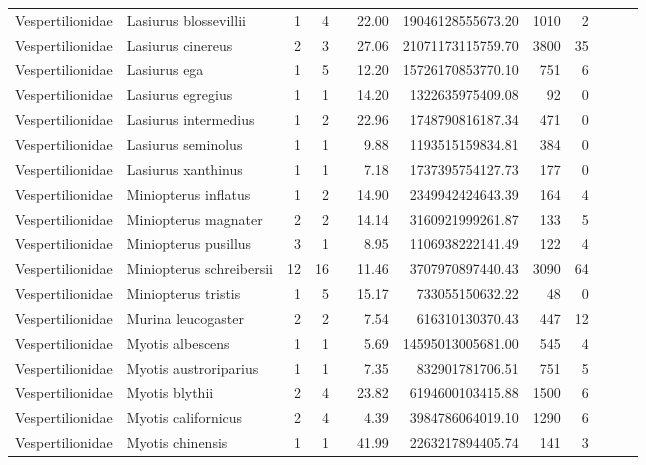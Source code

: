 \begin{landscape}
\begin{longtable}{@{}llrrrrrrrrrr@{}}
  Vespertilionidae & Lasiurus blossevillii &   1 &   4 &  & 22.00 & 19046128555673.20 & 1010 &   2 &  &  &  \\ 
  Vespertilionidae & Lasiurus cinereus &   2 &   3 &  & 27.06 & 21071173115759.70 & 3800 &  35 &  &  &  \\ 
  Vespertilionidae & Lasiurus ega &   1 &   5 &  & 12.20 & 15726170853770.10 & 751 &   6 &  &  &  \\ 
  Vespertilionidae & Lasiurus egregius &   1 &   1 &  & 14.20 & 1322635975409.08 &  92 &   0 &  &  &  \\ 
  Vespertilionidae & Lasiurus intermedius &   1 &   2 &  & 22.96 & 1748790816187.34 & 471 &   0 &  &  &  \\ 
  Vespertilionidae & Lasiurus seminolus &   1 &   1 &  & 9.88 & 1193515159834.81 & 384 &   0 &  &  &  \\ 
  Vespertilionidae & Lasiurus xanthinus &   1 &   1 &  & 7.18 & 1737395754127.73 & 177 &   0 &  &  &  \\ 
  Vespertilionidae & Miniopterus inflatus &   1 &   2 &  & 14.90 & 2349942424643.39 & 164 &   4 &  &  &  \\ 
  Vespertilionidae & Miniopterus magnater &   2 &   2 &  & 14.14 & 3160921999261.87 & 133 &   5 &  &  &  \\ 
  Vespertilionidae & Miniopterus pusillus &   3 &   1 &  & 8.95 & 1106938222141.49 & 122 &   4 &  &  &  \\ 
  Vespertilionidae & Miniopterus schreibersii &  12 &  16 &  & 11.46 & 3707970897440.43 & 3090 &  64 &  &  &  \\ 
  Vespertilionidae & Miniopterus tristis &   1 &   5 &  & 15.17 & 733055150632.22 &  48 &   0 &  &  &  \\ 
  Vespertilionidae & Murina leucogaster &   2 &   2 &  & 7.54 & 616310130370.43 & 447 &  12 &  &  &  \\ 
  Vespertilionidae & Myotis albescens &   1 &   1 &  & 5.69 & 14595013005681.00 & 545 &   4 &  &  &  \\ 
  Vespertilionidae & Myotis austroriparius &   1 &   1 &  & 7.35 & 832901781706.51 & 751 &   5 &  &  &  \\ 
  Vespertilionidae & Myotis blythii &   2 &   4 &  & 23.82 & 6194600103415.88 & 1500 &   6 &  &  &  \\ 
  Vespertilionidae & Myotis californicus &   2 &   4 &  & 4.39 & 3984786064019.10 & 1290 &   6 &  &  &  \\ 
  Vespertilionidae & Myotis chinensis &   1 &   1 &  & 41.99 & 2263217894405.74 & 141 &   3 &  &  &  \\ 

\end{longtable}
\end{landscape}
